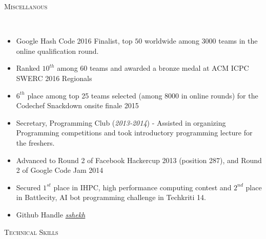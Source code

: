 \documentclass[9pt]{article}
\newenvironment{changemargin}[2]{%
  \begin{list}{}{%
    \setlength{\topsep}{0pt}%
    \setlength{\leftmargin}{#1}%
    \setlength{\rightmargin}{#2}%
    \setlength{\listparindent}{\parindent}%
    \setlength{\itemindent}{\parindent}%
    \setlength{\parsep}{\parskip}%
  }%
  \item[]}{\end{list}
}
\newcommand{\lineover}{
	\begin{changemargin}{-0.05in}{-0.10in}
		\vspace*{-9pt}
		\hrulefill \\
		\vspace*{-2pt}
	\end{changemargin}
}
\newcommand{\header}[1]{
	\begin{changemargin}{-0.5in}{-0.5in}
		\scshape{#1}\\
  	\lineover
	\end{changemargin}
}
\newenvironment{body} {
	\vspace*{-16pt}
	\begin{changemargin}{-0.6in}{-0.65in}
  }	
	{\end{changemargin}
}
\begin{document}
\vspace{1 mm}
\header{Miscellanous}
\begin{body}
	\vspace{14pt}
	\begin{changemargin}{0.15in}{0.15in}
	\begin{itemize}
       \item Google Hash Code 2016 Finalist, top $50$ worldwide among 3000 teams in the online qualification round.
       \item Ranked $10^{th}$ among 60 teams and awarded a bronze medal at ACM ICPC SWERC 2016 Regionals
	  \item $6^{th}$ place among top 25 teams selected (among 8000 in online rounds) for the Codechef Snackdown onsite finale 2015 \\
	  \item Secretary, Programming Club (\textit{2013-2014}) - Assisted in organizing Programming competitions 
	    and took introductory programming lecture for the freshers.
 	  \item Advanced to Round 2 of Facebook Hackercup 2013 (position 287), and Round 2 of Google Code Jam 2014 \\
	  \item Secured $1^{st}$ place in IHPC, high performance computing contest and $2^{nd}$ place in Battlecity, AI bot programming challenge in Techkriti 14. \\
	    \item Github Handle \href{http://github.com/sshekh} {\emph{{\textit{\textcolor{ProcessBlue}{sshekh}}}}} \\
	\end{itemize}
        \end{changemargin}
\end{body}
\vspace{3 mm}
\header{Technical Skills}
\end{document}
